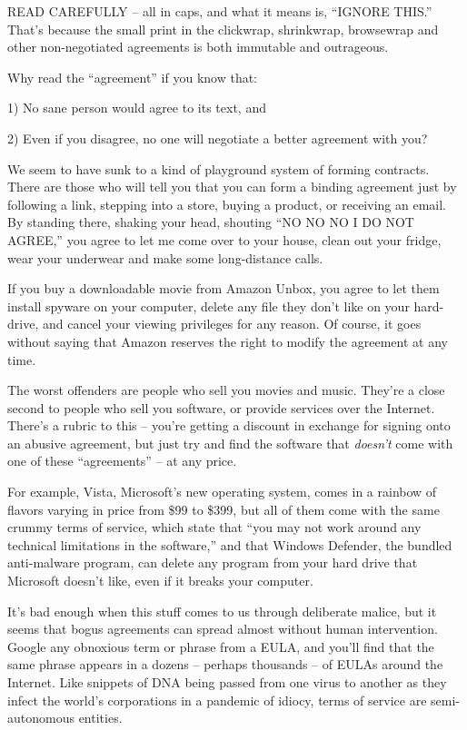 READ CAREFULLY -- all in caps, and what it means is, ``IGNORE THIS.''
That's because the small print in the clickwrap, shrinkwrap,
browsewrap and other non-negotiated agreements is both immutable
and outrageous.

Why read the ``agreement'' if you know that:

1) No sane person would agree to its text, and

2) Even if you disagree, no one will negotiate a better agreement
with you?

We seem to have sunk to a kind of playground system of forming
contracts. There are those who will tell you that you can form a
binding agreement just by following a link, stepping into a store,
buying a product, or receiving an email. By standing there, shaking
your head, shouting ``NO NO NO I DO NOT AGREE,'' you agree to let me
come over to your house, clean out your fridge, wear your underwear
and make some long-distance calls.

If you buy a downloadable movie from Amazon Unbox, you agree to let
them install spyware on your computer, delete any file they don't
like on your hard-drive, and cancel your viewing privileges for any
reason. Of course, it goes without saying that Amazon reserves the
right to modify the agreement at any time.

The worst offenders are people who sell you movies and music.
They're a close second to people who sell you software, or provide
services over the Internet. There's a rubric to this -- you're
getting a discount in exchange for signing onto an abusive
agreement, but just try and find the software that \emph{doesn't}
come with one of these ``agreements'' -- at any price.

For example, Vista, Microsoft's new operating system, comes in a
rainbow of flavors varying in price from \$99 to \$399, but all of
them come with the same crummy terms of service, which state that
``you may not work around any technical limitations in the
software,'' and that Windows Defender, the bundled anti-malware
program, can delete any program from your hard drive that Microsoft
doesn't like, even if it breaks your computer.

It's bad enough when this stuff comes to us through deliberate
malice, but it seems that bogus agreements can spread almost
without human intervention. Google any obnoxious term or phrase
from a EULA, and you'll find that the same phrase appears in a
dozens -- perhaps thousands -- of EULAs around the Internet. Like
snippets of DNA being passed from one virus to another as they
infect the world's corporations in a pandemic of idiocy, terms of
service are semi-autonomous entities.


